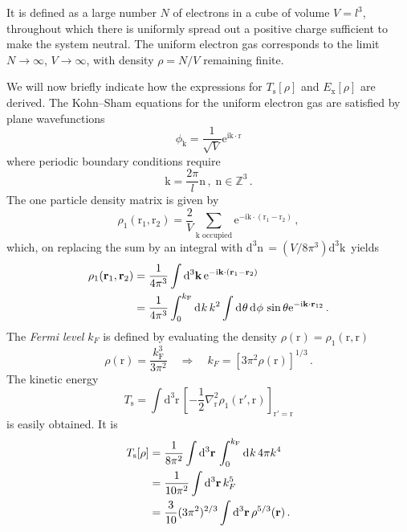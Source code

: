 \documentclass{article}
\theoremstyle{plain}\theoremheaderfont{\normalfont\itshape}\theorembodyfont{\rmfamily}\theoremseparator{.}\newtheorem*{rem}{Remark}\newtheorem*{ex}{Example}\newtheorem*{proof}{Proof}\newtheorem*{altp}{Alternative proof}
\theoremstyle{plain}\theoremheaderfont{\normalfont\bfseries}\theorembodyfont{\rmfamily}\theoremseparator{.}\newtheorem{thm}{Theorem}[section]\newtheorem{lem}[thm]{Lemma}\newtheorem{prop}[thm]{Proposition}\newtheorem*{cor}{Corollary}\newtheorem{defn}[thm]{Definition}\newtheorem{clm}[thm]{Claim}\newtheorem{clminproof}{Claim}
\theoremstyle{break}\theoremheaderfont{\normalfont\itshape}\theorembodyfont{\rmfamily}\theoremseparator{.\medskip}\newtheorem*{proofskip}{Proof}\newtheorem*{exs}{Examples}\newtheorem*{rems}{Remarks}
\theoremstyle{break}\theoremheaderfont{\normalfont\bfseries}\theorembodyfont{\rmfamily}\theoremseparator{.\medskip}\newtheorem{lemskip}[thm]{Lemma}\newtheorem{defnskip}[thm]{Definition}\newtheorem{propskip}[thm]{Proposition}\newtheorem{thmskip}[thm]{Theorem}
\numberwithin{equation}{section}
\newcommand{\ii}{\mathrm{i}}
\newcommand{\e}{\mathrm{e}}
\newcommand{\dd}[2][]{\mathrm{d}^{#1} #2\,}
\newcommand{\vb}[1]{\bm{\mathrm{#1}}}
\newcommand{\laplacian}{\nabla^2}
\newcommand{\s}{_{\text{s}}}
\newcommand{\x}{_{\text{x}}}
\begin{document}
    It is defined as a large number \(N\) of electrons in a cube of volume \(V=l^3\), throughout which there is uniformly spread out a positive charge sufficient to make the system neutral. The uniform electron gas corresponds to the limit \(N\to\infty\), \(V\to\infty\), with density \(\rho=N/V\) remaining finite.

    We will now briefly indicate how the expressions for \(T\s[\rho]\) and \(E\x[\rho]\) are derived. The Kohn--Sham equations for the uniform electron gas are satisfied by plane wavefunctions
    \begin{equation}
        \phi_{\vb{k}}=\frac{1}{\sqrt{V}}\e^{\ii\vb{k}\cdot\vb{r}}
    \end{equation}
    where periodic boundary conditions require
    \begin{equation}
        \vb{k}=\frac{2\pi}{l}\vb{n}\,,\;\vb{n}\in\mathbb{Z}^3\,.
    \end{equation}
    The one particle density matrix is given by
    \begin{equation}
        \rho_1(\vb{r}_1,\vb{r}_2)=\frac{2}{V}\sum_{\vb{k}\text{ occupied}}\e^{-\ii\vb{k}\cdot(\vb{r}_1-\vb{r}_2)}\,,
    \end{equation}
    which, on replacing the sum by an integral with \(\dd[3]{\vb{n}}=(V/8\pi^3)\dd[3]{\vb{k}}\) yields
    \begin{align}
        \rho_1(\vb{r}_1,\vb{r}_2)&=\frac{1}{4\pi^3}\int\dd[3]{\vb{k}}\e^{-\ii\vb{k}\cdot(\vb{r}_1-\vb{r}_2)}\notag\\
        &=\frac{1}{4\pi^3}\int_{0}^{k_{\text{F}}}\dd{k}k^2\int\dd{\theta}\dd{\phi}\sin\theta \e^{-\ii\vb{k}\cdot\vb{r}_{12}}\,.
    \end{align}
    The \textit{Fermi level} \(k_F\) is defined by evaluating the density \(\rho(\vb{r})=\rho_1(\vb{r},\vb{r})\)
    \begin{equation}
        \rho(\vb{r})=\frac{k_{\text{F}}^3}{3\pi^2}\quad\Rightarrow\quad k_F=[3\pi^2\rho(\vb{r})]^{1/3}\,.
    \end{equation}
    The kinetic energy
    \begin{equation}
        T\s=\int\dd[3]{\vb{r}}\left[-\frac{1}{2}\laplacian_{\vb{r}}\rho_1(\vb{r}',\vb{r})\right]_{\vb{r}'=\vb{r}}
    \end{equation}
    is easily obtained. It is
    \begin{align}
        T\s[\rho]&=\frac{1}{8\pi^2}\int\dd[3]{\vb{r}}\int_{0}^{k_{\text{F}}}\dd{k}4\pi k^4\notag\\
        &=\frac{1}{10\pi^2}\int\dd[3]{\vb{r}}k_F^{5}\notag\\
        &=\frac{3}{10}(3\pi^2)^{2/3}\int\dd[3]{\vb{r}}\rho^{5/3}(\vb{r})\,.
    \end{align}
\end{document}

